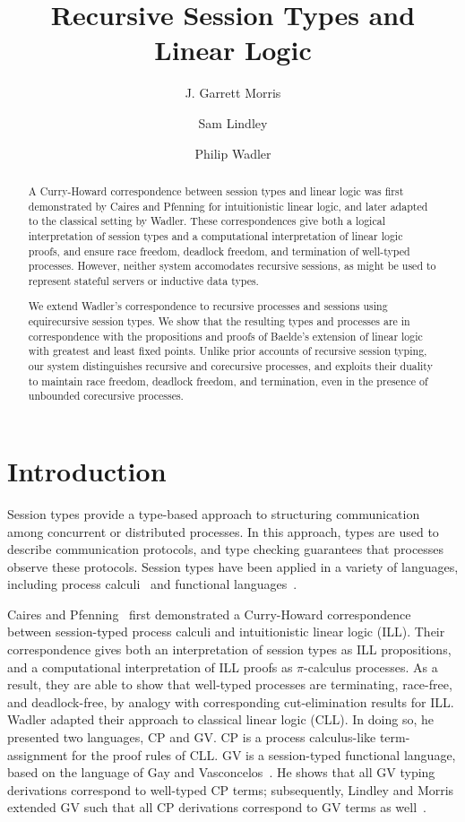\documentclass[orivec,envcountsame]{llncs}
\title{Recursive Session Types and Linear Logic}
\author{J. Garrett Morris \and Sam Lindley \and Philip Wadler}
\institute{University of Edinburgh \\
           \email{Garrett.Morris@ed.ac.uk,\{slindley,wadler\}@inf.ed.ac.uk}}
\begin{document}
\maketitle

\begin{abstract}
  A Curry-Howard correspondence between session types and linear logic was first demonstrated by
  Caires and Pfenning for intuitionistic linear logic, and later adapted to the classical setting by
  Wadler. These correspondences give both a logical interpretation of session types and a
  computational interpretation of linear logic proofs, and ensure race freedom, deadlock freedom,
  and termination of well-typed processes. However, neither system accomodates recursive sessions,
  as might be used to represent stateful servers or inductive data types.

  We extend Wadler's correspondence to recursive processes and sessions using equirecursive session
  types. We show that the resulting types and processes are in correspondence with the propositions
  and proofs of Baelde's extension of linear logic with greatest and least fixed points. Unlike
  prior accounts of recursive session typing, our system distinguishes recursive and corecursive
  processes, and exploits their duality to maintain race freedom, deadlock freedom, and termination,
  even in the presence of unbounded corecursive processes.
\end{abstract}

\section{Introduction}\label{sec:intro}

Session types provide a type-based approach to structuring communication among concurrent or
distributed processes.  In this approach, types are used to describe communication protocols, and
type checking guarantees that processes observe these protocols.  Session types have been applied in
a variety of languages, including process calculi~\cite{Honda93,Honda98} and functional
languages~\cite{GayVasconcelos10}.

Caires and Pfenning~\cite{CairesPfenning10} first demonstrated a Curry-Howard correspondence between
session-typed process calculi and intuitionistic linear logic (ILL).  Their correspondence gives
both an interpretation of session types as ILL propositions, and a computational interpretation of
ILL proofs as $\pi$-calculus processes.  As a result, they are able to show that well-typed
processes are terminating, race-free, and deadlock-free, by analogy with corresponding
cut-elimination results for ILL.  Wadler adapted their approach to classical linear logic (CLL).  In
doing so, he presented two languages, CP and GV.  CP is a process calculus-like term-assignment for
the proof rules of CLL.  GV is a session-typed functional language, based on the language of Gay and
Vasconcelos~\cite{GayVasconcelos10}.  He shows that all GV typing derivations correspond to
well-typed CP terms; subsequently, Lindley and Morris extended GV such that all CP derivations
correspond to GV terms as well~\cite{LindleyM14}.
\end{document}
